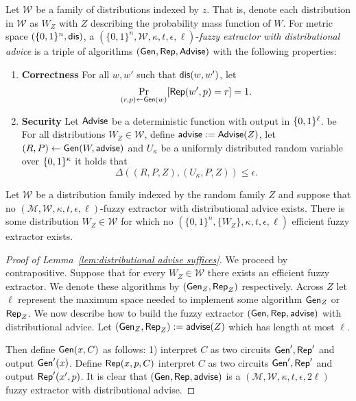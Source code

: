 \begin{definition}
\label{def:fe distributional}
Let $\mathcal{W}$ be a family of distributions indexed by $z$.  That is, denote each distribution in $\mathcal{W}$ as $W_Z$ with $Z$ describing the probability mass function of $W$.  
For metric space $(\{0,1\}^n, \mathsf{dis})$, a $(\{0,1\}^n, \mathcal{W}, \kappa, t, \epsilon, \ell)$-\emph{fuzzy extractor with distributional advice} is a triple of algorithms $({\mathsf{Gen}}, {\mathsf{Rep}}, {\mathsf{Advise}})$ with the following properties:
\begin{enumerate} 
\itemsep0em
\item \textbf{Correctness} For all $w, w'$ such that $\mathsf{dis}(w, w')$, let \[\Pr_{(r, p) \leftarrow {\ensuremath{\mathsf{Gen}}}(w)}[{\mathsf{Rep}}(w', p) = r]=1.\]
\item \textbf{Security} Let ${\mathsf{Advise}}$ be a deterministic function with output in $\{0, 1\}^\ell$.  be For all distributions $W_Z \in \mathcal{W}$, define ${\mathsf{advise}}:= {\mathsf{Advise}}(Z)$, let $(R, P) \leftarrow {\ensuremath{\mathsf{Gen}}}(W, {\mathsf{advise}})$ and $U_\kappa$ be a uniformly distributed random variable over $\{0, 1\}^\kappa$ it holds that \[\Delta((R, P, Z), (U_\kappa, P, Z))\le \epsilon.\]
\end{enumerate}
\end{definition}


\begin{lemma}

Let $\mathcal{W}$ be a distribution family indexed by the random family $Z$ and suppose that no $(\mathcal{M}, \mathcal{W}, \kappa, t, \epsilon, \ell)$-fuzzy extractor with distributional advice exists.  There is some distribution $W_Z \in \mathcal{W}$ for which no  $(\{0,1\}^n, \{W_Z\}, \kappa, t, \epsilon, \ell)$ efficient fuzzy extractor exists.
\label{lem:distributional advise suffices}
\end{lemma}
\begin{proof}[Proof of Lemma~\ref{lem:distributional advise suffices}]
We proceed by contrapositive.  Suppose that for every $W_Z\in\mathcal{W}$ there exists an efficient fuzzy extractor.  We denote these algorithms by $({\mathsf{Gen}}_Z, {\mathsf{Rep}}_Z)$ respectively.  Across $Z$ let $\ell$ represent the maximum space needed to implement some algorithm ${\mathsf{Gen}}_Z$ or ${\mathsf{Rep}}_Z$. We now describe how to build the fuzzy extractor $({\mathsf{Gen}}, {\mathsf{Rep}}, {\mathsf{advise}})$ with distributional advice.  Let $({\mathsf{Gen}}_Z, {\mathsf{Rep}}_Z) := {\mathsf{advise}}(Z)$ which has length at most $\ell$.

Then define ${\mathsf{Gen}}(x, C)$ as follows: 1) interpret $C$ as two circuits ${\mathsf{Gen}}', {\mathsf{Rep}}'$ and output ${\mathsf{Gen}}'(x)$.  Define ${\mathsf{Rep}}(x, p, C)$ interpret $C$ as two circuits ${\mathsf{Gen}}', {\mathsf{Rep}}'$ and output ${\mathsf{Rep}}'(x', p)$.  It is clear that $({\mathsf{Gen}}, {\mathsf{Rep}}, {\mathsf{advise}})$ is a $(\mathcal{M}, \mathcal{W}, \kappa, t, \epsilon, 2\ell)$ fuzzy extractor with distributional advise.
\end{proof}

